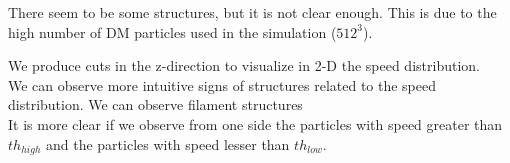 \documentclass[12pt]{article}
\begin{document}
There seem to be some structures, but it is not clear enough. This is due to the high number of DM particles used in the simulation ($512^3$). 


We produce cuts in the z-direction to visualize in 2-D the speed distribution. \\




We can observe more intuitive signs of structures related to the speed distribution. 
We can observe filament structures\\

It is more clear if we observe from one side the particles with speed greater than $th_{high}$ and the particles with speed lesser than $th_{low}$.\\

\end{document}
